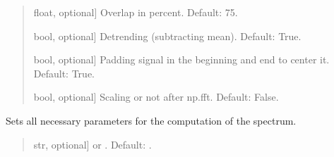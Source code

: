 \documentclass[letterpaper,10pt,english]{sphinxmanual}
\begin{document}
\begin{fulllineitems}
\begin{fulllineitems}
\begin{quote}
\begin{description}
\begin{description}
\sphinxlineitem{\sphinxstylestrong{overlap\_percent}}{[}float, optional{]}
\sphinxAtStartPar
Overlap in percent. Default: 75.

\sphinxlineitem{\sphinxstylestrong{detrend}}{[}bool, optional{]}
\sphinxAtStartPar
Detrending (subtracting mean). Default: True.

\sphinxlineitem{\sphinxstylestrong{padding}}{[}bool, optional{]}
\sphinxAtStartPar
Padding signal in the beginning and end to center it.
Default: True.

\sphinxlineitem{\sphinxstylestrong{scaling}}{[}bool, optional{]}
\sphinxAtStartPar
Scaling or not after np.fft. Default: False.

\end{description}

\end{description}\end{quote}

\end{fulllineitems}


\begin{fulllineitems}
\label{\detokenize{classes:dsptools.classes.signal_class.Signal.set_spectrum_parameters}}
\pysigstartsignatures
{}
\pysigstopsignatures
\sphinxAtStartPar
Sets all necessary parameters for the computation of the spectrum.
\begin{quote}\begin{description}
\begin{description}
\sphinxlineitem{\sphinxstylestrong{method}}{[}str, optional{]}
\sphinxAtStartPar
{} or . Default: .


\end{description}
\end{description}
\end{quote}
\end{fulllineitems}
\end{fulllineitems}
\end{document}
